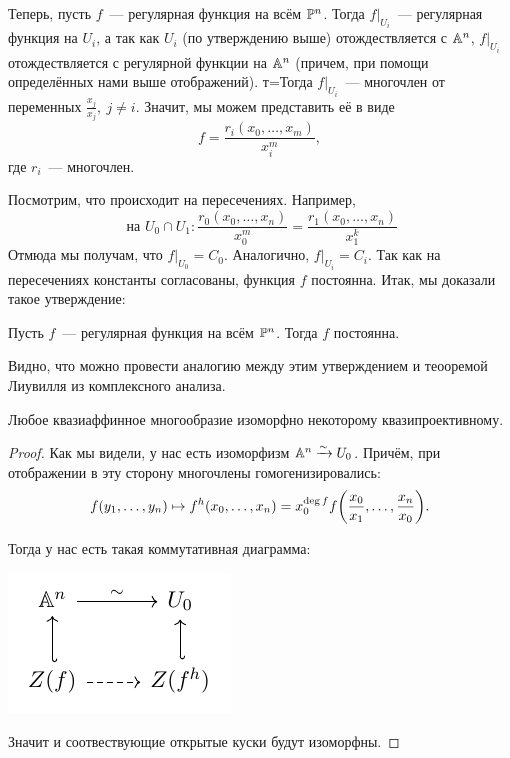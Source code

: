 	Теперь, пусть $f$~--- регулярная функция на всём $\PP^n$. Тогда $f\vert_{U_i}$~--- регулярная функция на $U_i$, а так как $U_i$ (по утверждению выше) отождествляется с $\AA^n$, $f\vert_{U_i}$ отождествляется с регулярной функции на $\AA^n$ (причем, при помощи определённых нами выше отображений). т=Тогда $f\vert_{U_i}$~--- многочлен от переменных $\frac{x_j}{x_j}, \ j \neq i$. Значит, мы можем представить её в виде 
	\[
		f = \frac{r_i(x_0, \ldots, x_m)}{x_i^m}, 
	\]
	где $r_i$~--- многочлен. 

	Посмотрим, что происходит на пересечениях. Например, 
	\[
		\text{ на } U_0 \cap U_1\colon \frac{r_0(x_0, \ldots, x_n)}{x_0^m} = \frac{r_1(x_0, \ldots, x_n)}{x_1^k} 
	\]
	Отмюда мы получам,  что $f\vert_{U_0} = C_0$. Аналогично, $f\vert_{U_i} = C_i$. Так как на пересечениях константы согласованы, функция $f$ постоянна. Итак, мы доказали такое утверждение: 

	\begin{statement} 
		Пусть $f$~--- регулярная функция на всём $\PP^n$. Тогда $f$ постоянна. 
	\end{statement}

	Видно, что можно провести аналогию между этим утверждением и теооремой Лиувилля из комплексного анализа. 

	\begin{statement} 
		Любое квазиаффинное многообразие изоморфно некоторому квазипроективному. 
	\end{statement}
	\begin{proof}
		Как мы видели, у нас есть изоморфизм $\AA^n \xrightarrow{\sim} U_0$. Причём, при отображении в эту сторону многочлены гомогенизировались: 
		\[
			f(y_1, \ldots, y_n) \mapsto f^h(x_0, \ldots, x_n) = x_0^{\deg{f}}f\lr*{\frac{x_0}{x_1}, \ldots, \frac{x_n}{x_0}}. 
		\]

		Тогда у нас есть такая коммутативная диаграмма: 
		\begin{center}
			\includegraphics{lectures/5/pictures/cd_4.pdf}
		\end{center}

		Значит и соотвествующие открытые куски будут изоморфны. 
	\end{proof}

